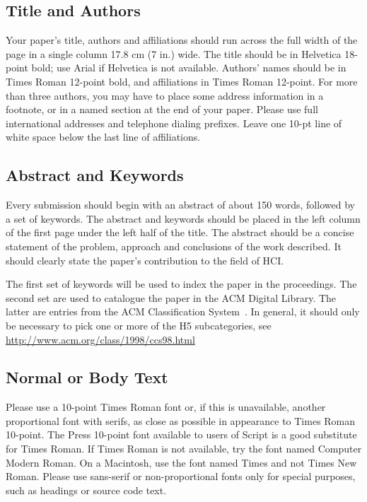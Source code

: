 \documentclass{article}
\begin{document}
\subsection{Title and Authors}

Your paper's title, authors and affiliations should run across the
full width of the page in a single column 17.8 cm (7 in.) wide.  The
title should be in Helvetica 18-point bold; use Arial if Helvetica is
not available.  Authors' names should be in Times Roman 12-point bold,
and affiliations in Times Roman 12-point.  For more than three authors,
you may have to place some address information in a footnote, or in a named
section at the end of your paper. Please use full international addresses and
telephone dialing prefixes.  Leave one 10-pt line of white space below the last
line of affiliations.

\subsection{Abstract and Keywords}

Every submission should begin with an abstract of about 150 words,
followed by a set of keywords. The abstract and keywords should be
placed in the left column of the first page under the left half of the
title. The abstract should be a concise statement of the problem,
approach and conclusions of the work described.  It should clearly
state the paper's contribution to the field of HCI.

The first set of keywords will be used to index the paper in the
proceedings. The second set are used to catalogue the paper in the ACM
Digital Library. The latter are entries from the ACM Classification
System~\cite{acm_categories}.  In general, it should only be necessary
to pick one or more of the H5 subcategories, see
\url{http://www.acm.org/class/1998/ccs98.html}

\subsection{Normal or Body Text}

Please use a 10-point Times Roman font or, if this is unavailable,
another proportional font with serifs, as close as possible in
appearance to Times Roman 10-point. The Press 10-point font available
to users of Script is a good substitute for Times Roman. If Times
Roman is not available, try the font named Computer Modern Roman. On a
Macintosh, use the font named Times and not Times New Roman. Please
use sans-serif or non-proportional fonts only for special purposes,
such as headings or source code text.
\end{document}
